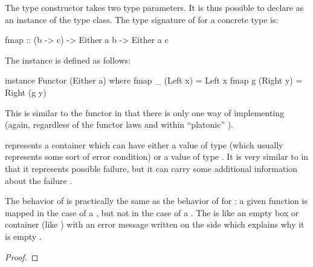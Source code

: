 \begin{example}
  \label{ex:functor-either-haskell}

  The  type constructor takes two type parameters. It
  is thus possible to declare  as an instance of the
   type class. The type signature of  for
  a concrete type  is:
  \begin{codehaskell}
fmap :: (b -> c) -> Either a b -> Either a c
  \end{codehaskell}

  The instance is defined as follows:
  \begin{codehaskell}
instance Functor (Either a) where
  fmap _ (Left x)  = Left x
  fmap g (Right y) = Right (g y)
  \end{codehaskell}
  This is similar to the  functor in that there is
  only one way of implementing  (again, regardless of the
  functor laws and within ``platonic'' \hask).

   represents a container which can have either a
  value of type  (which usually represents some sort of
  error condition) or a value of type . It is very similar
  to  in that it represents possible failure, but it can
  carry some additional information about the failure
  \parencite{yorgey-2009}.

  The behavior of  is practically the same as the
  behavior of  for : a given function is
  mapped in the case of a , but not in the case of a
  . The  is like an empty box or container
  (like ) with an error message written on the side
  which explains why it is empty \parencite{lipovaca-2011}.

  \begin{proof}


\end{proof}
\end{example}
